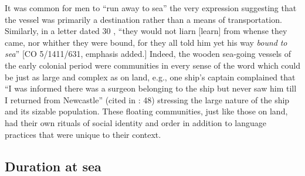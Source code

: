 It was common for men to “run away to sea” \citep[67,]{Jarvis2010} the very expression suggesting that the vessel was primarily a destination rather than a means of transportation. Similarly, in a letter dated 30 \citealt{July1699}, “they would not liarn [learn] from whense they came, nor whither they were bound, for they all told him yet his way \textit{bound} \textit{to} \textit{sea}” [CO 5/1411/631, emphasis added.] Indeed, the wooden sea-going vessels of the early colonial period were communities in every sense of the word which could be just as large and complex as on land, e.g., one ship’s captain complained that “I was informed there was a surgeon belonging to the ship but never saw him till I returned from Newcastle” (cited in \citealt{Brown2011}: 48) stressing the large nature of the ship and its sizable population. These floating communities, just like those on land, had their own rituals of social identity and order in addition to language practices that were unique to their context.

\subsection{\textbf{Duration} \textbf{at} \textbf{sea}}%

